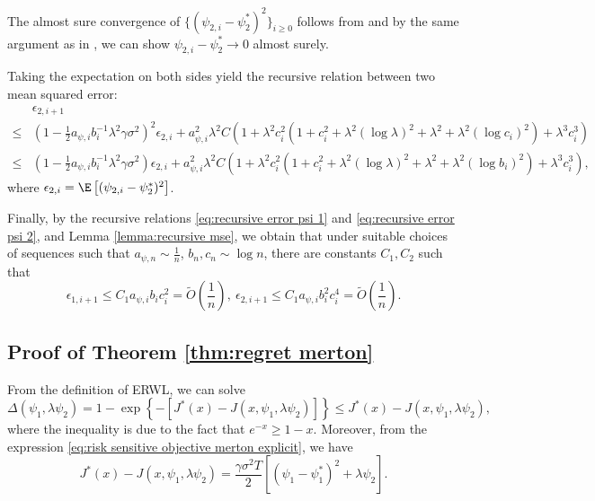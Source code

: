 The almost sure convergence of $\{ (\psi_{2,i} - \psi_2^*)^2\}_{i\geq 0}$ follows from \citet[Theorem 1]{robbins1971convergence} and by the same argument as in \citet[Theorem 2]{andradottir1995stochastic}, we can show $\psi_{2,i} - \psi_2^* \to 0$ almost surely. 

Taking the expectation on both sides yield the recursive relation between two mean squared error:
\begin{equation}
\label{eq:recursive error psi 2}
\begin{aligned}
&	\epsilon_{2,i+1} \\
\leq & (1 - \frac{1}{2}a_{\psi,i}b_i^{-1} \lambda^2\gamma\sigma^2 )^2 \epsilon_{2,i} + a_{\psi,i}^2\lambda^2 C \left(  1 + \lambda^2c_i^2 \left( 1 + c_i^2 + \lambda^2(\log\lambda)^2 + \lambda^2 + \lambda^2(\log c_i)^2\right)  +  \lambda^3c_i^3  \right) \\	
\leq & (1 - \frac{1}{2}a_{\psi,i}b_i^{-1} \lambda^2\gamma\sigma^2 ) \epsilon_{2,i} + a_{\psi,i}^2\lambda^2 C \left( 1 + \lambda^2c_i^2 \left( 1 + c_i^2 + \lambda^2(\log\lambda)^2 + \lambda^2 + \lambda^2(\log b_i)^2\right)  +  \lambda^3c_i^3 \right),
\end{aligned}
\end{equation}
where $\epsilon_{2,i} = \E\left[ (\psi_{2,i} - \psi_{2}^*)^2  \right]$.

Finally, by the recursive relations \eqref{eq:recursive error psi 1} and \eqref{eq:recursive error psi 2}, and Lemma \ref{lemma:recursive mse}, we obtain that under suitable choices of sequences such that $a_{\psi,n} \sim \frac{1}{n}$, $b_n,c_n \sim \log n$, there are constants $C_1,C_2$ such that 
\[\epsilon_{1,i+1} \leq C_1 a_{\psi,i}b_ic_i^2 = \tilde{O}(\frac{1}{n}),\  \epsilon_{2,i+1} \leq C_1 a_{\psi,i}b_i^2c_i^4 = \tilde{O}(\frac{1}{n}). \]

\subsection{Proof of Theorem \ref{thm:regret merton}}
From the definition of ERWL, we can solve \[\Delta(\psi_1,\lambda \psi_2) = 1 - \exp\left\{ - \left[ J^*(x) -  J(x,\psi_1,\lambda \psi_2) \right] \right\} \leq J^*(x) -  J(x,\psi_1,\lambda \psi_2) , \]
where the inequality is due to the fact that $e^{-x} \geq 1 - x$. Moreover, from the expression \eqref{eq:risk sensitive objective merton explicit}, we have
\[J^*(x) -  J(x,\psi_1,\lambda \psi_2) = \frac{\gamma \sigma^2 T}{2}\left[ (\psi_1 - \psi_1^*)^2 + \lambda\psi_2\right] .  \]
